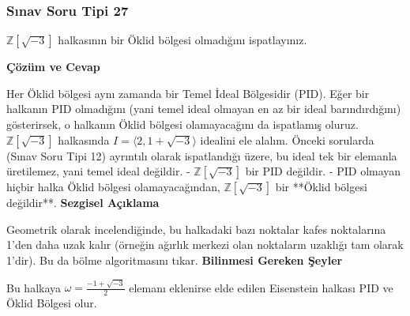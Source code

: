 \documentclass[11pt, a4paper]{article}
\newenvironment{cozum}{
    \vspace{0.5cm}
    \noindent\textcolor{green!60!black}{\faCheckCircle\enspace \textbf{\Large Çözüm ve Cevap}}\par\vspace{0.2cm}
}{}
\newenvironment{sezgisel}{
    \vspace{0.5cm}
    \noindent\textcolor{orange!80!black}{\faLightbulb\enspace \textbf{\Large Sezgisel Açıklama}}\par\vspace{0.2cm}
    \itshape
}{}
\newenvironment{bilgi}{
    \vspace{0.5cm}
    \noindent\textcolor{red!70!black}{\faExclamationTriangle\enspace \textbf{\Large Bilinmesi Gereken Şeyler}}\par\vspace{0.2cm}
}{}
\begin{document}
\subsubsection{Sınav Soru Tipi 27}
\begin{sinavbox}
$\mathbb{Z}[\sqrt{-3}]$ halkasının bir Öklid bölgesi olmadığını ispatlayınız.
\end{sinavbox}
\begin{cozum}
Her Öklid bölgesi aynı zamanda bir Temel İdeal Bölgesidir (PID). Eğer bir halkanın PID olmadığını (yani temel ideal olmayan en az bir ideal barındırdığını) gösterirsek, o halkanın Öklid bölgesi olamayacağını da ispatlamış oluruz.
$\mathbb{Z}[\sqrt{-3}]$ halkasında $I = \langle 2, 1+\sqrt{-3} \rangle$ idealini ele alalım.
Önceki sorularda (Sınav Soru Tipi 12) ayrıntılı olarak ispatlandığı üzere, bu ideal tek bir elemanla üretilemez, yani temel ideal değildir.
- $\mathbb{Z}[\sqrt{-3}]$ bir PID değildir.
- PID olmayan hiçbir halka Öklid bölgesi olamayacağından, $\mathbb{Z}[\sqrt{-3}]$ bir **Öklid bölgesi değildir**.
\end{cozum}
\begin{sezgisel}
Geometrik olarak incelendiğinde, bu halkadaki bazı noktalar kafes noktalarına 1'den daha uzak kalır (örneğin ağırlık merkezi olan noktaların uzaklığı tam olarak 1'dir). Bu da bölme algoritmasını tıkar.
\end{sezgisel}
\begin{bilgi}
Bu halkaya $\omega = \frac{-1+\sqrt{-3}}{2}$ elemanı eklenirse elde edilen Eisenstein halkası PID ve Öklid Bölgesi olur.
\end{bilgi}

\newpage
\end{document}
